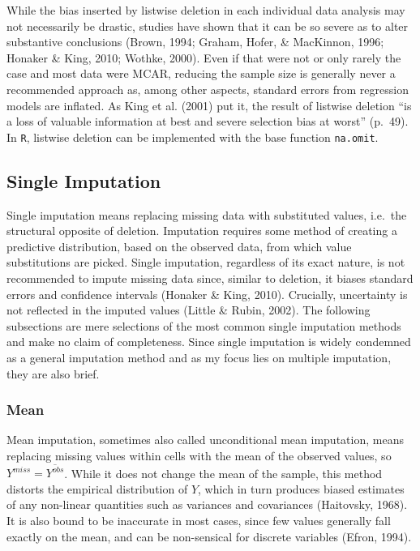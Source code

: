 \documentclass[12pt,econ]{sources/authesis}
\begin{document}
While the bias inserted by listwise deletion in each individual data analysis may not necessarily be drastic, studies have shown that it can be so severe as to alter substantive conclusions (Brown, 1994; Graham, Hofer, \& MacKinnon, 1996; Honaker \& King, 2010; Wothke, 2000). Even if that were not or only rarely the case and most data were MCAR, reducing the sample size is generally never a recommended approach as, among other aspects, standard errors from regression models are inflated. As King et al. (2001) put it, the result of listwise deletion ``is a loss of valuable information at best and severe selection bias at worst'' (p.~49). In \texttt{R}, listwise deletion can be implemented with the base function \texttt{na.omit}.

\hypertarget{ordmiss-theory-singimpute}{%
\subsection{Single Imputation}\label{ordmiss-theory-singimpute}}

Single imputation means replacing missing data with substituted values, i.e.~the structural opposite of deletion. Imputation requires some method of creating a predictive distribution, based on the observed data, from which value substitutions are picked. Single imputation, regardless of its exact nature, is not recommended to impute missing data since, similar to deletion, it biases standard errors and confidence intervals (Honaker \& King, 2010). Crucially, uncertainty is not reflected in the imputed values (Little \& Rubin, 2002). The following subsections are mere selections of the most common single imputation methods and make no claim of completeness. Since single imputation is widely condemned as a general imputation method and as my focus lies on multiple imputation, they are also brief.

\hypertarget{ordmiss-theory-impute-mean}{%
\subsubsection{Mean}\label{ordmiss-theory-impute-mean}}

Mean imputation, sometimes also called unconditional mean imputation, means replacing missing values within cells with the mean of the observed values, so \(Y^{miss} = \overline{Y^{obs}}\). While it does not change the mean of the sample, this method distorts the empirical distribution of \(Y\), which in turn produces biased estimates of any non-linear quantities such as variances and covariances (Haitovsky, 1968). It is also bound to be inaccurate in most cases, since few values generally fall exactly on the mean, and can be non-sensical for discrete variables (Efron, 1994).
\end{document}
